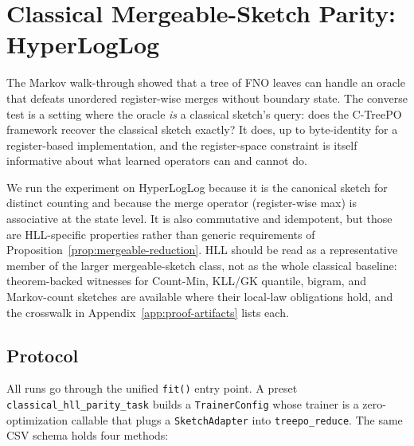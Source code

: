 \section{Classical Mergeable-Sketch Parity: HyperLogLog}\label{sec:hll-parity}

The Markov walk-through showed that a tree of FNO leaves can handle an
oracle that defeats unordered register-wise merges without boundary
state. The converse test is a setting where the oracle \emph{is} a
classical sketch's query: does the C-TreePO framework recover the
classical sketch exactly? It does, up to byte-identity for a
register-based implementation, and the register-space constraint is
itself informative about what learned operators can and cannot do.

We run the experiment on HyperLogLog \citep{FlajoletEtAl2007,HeuleEtAl2013}
because it is the canonical sketch for distinct counting and because the
merge operator (register-wise max) is associative at the state level. It is
also commutative and idempotent, but those are HLL-specific properties rather
than generic requirements of Proposition~\ref{prop:mergeable-reduction}.
HLL should be read as a representative member of the larger mergeable-sketch
class, not as the whole classical baseline: theorem-backed witnesses for
Count-Min, KLL/GK quantile, bigram, and Markov-count sketches are available
where their local-law obligations hold, and the crosswalk in
Appendix~\ref{app:proof-artifacts} lists each.

\subsection{Protocol}

All runs go through the unified \texttt{fit()} entry point. A preset
\texttt{classical\_hll\_parity\_task} builds a \texttt{TrainerConfig} whose
trainer is a zero-optimization callable that plugs a \texttt{SketchAdapter}
into \texttt{treepo\_reduce}. The same CSV schema holds four methods:

